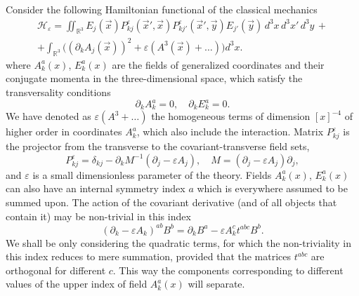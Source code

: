\documentclass[12pt]{article}
\newcommand{\pl}{\partial}
\newcommand{\Hcl}{\mathcal{H}}
\newcommand{\RR}{\mathbb{R}}
\newcommand{\ve}{\varepsilon}
\begin{document}
	Consider the following Hamiltonian functional of the classical
    mechanics
\begin{multline}
\label{qH3}
    \Hcl_{\ve}
    = \iint_{\RR^{3}} E_{j}(\vec{x}) P_{kj}^{\ve}(\vec{x}',\vec{x})
	P_{kj'}^{\ve}(\vec{x}',\vec{y}) E_{j'}(\vec{y})
	    \, d^{3}x \, d^{3}x' \, d^{3}y \,+\\
	+ \int_{\RR^{3}}\bigl((\pl_{k} A_{j}(\vec{x}))^{2}
	+ \ve (A^{3}(\vec{x})+\ldots) \bigr) d^{3}x .
\end{multline}
    where
$ A_{k}^{a}(x) $,
$ E_{k}^{a}(x) $ are the fields of generalized coordinates and their
    conjugate momenta in the three-dimensional space, which satisfy
    the transversality conditions
\begin{equation}
\label{transAE}
    \pl_{k} A_{k}^{a} = 0, \quad 
    \pl_{k} E_{k}^{a} = 0 .
\end{equation}
	We have denoted as 
$ \ve (A^{3}+\ldots) $
	the homogeneous terms of dimension
$ [x]^{-4} $
	of higher order in coordinates
$ A_{k}^{a} $,
    which also include the interaction.
    Matrix
$ P_{kj}^{\ve} $ is the projector from the transverse
	to the covariant-transverse field sets,
\begin{equation*}
    P_{kj}^{\ve}
	= \delta_{kj} - \pl_{k} M^{-1} (\pl_{j}-\ve A_{j}),
	\quad M = (\pl_{j} - \ve A_{j}) \pl_{j} ,
\end{equation*}
    and 
$ \ve $ is a small dimensionless parameter of the theory.
	Fields
$ A_{k}^{a}(x) $,
$ E_{k}^{a}(x) $
	can also have an internal symmetry index
$ a $
	which is everywhere assumed to be summed upon.
	The action of the covariant derivative (and of all objects that contain it)
	may be non-trivial in this index
\begin{equation*}
    (\pl_{k}-\ve A_{k})^{ab} B^{b} = \pl_{k} B^{a}
	- \ve A_{k}^{c} t^{abc} B^{b} .
\end{equation*}
	We shall be only considering the quadratic terms, for which the
    non-triviality in this index reduces to mere summation,
	provided that the matrices 
$ t^{abc} $
	are orthogonal for different
$ c $.
    This way the components corresponding to different values of the upper
    index of field
$ A_{k}^{a}(x) $
    will separate.
\end{document}
